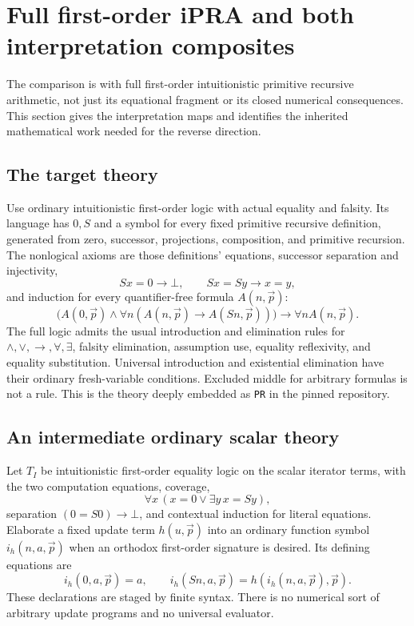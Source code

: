 \section{Full first-order iPRA and both interpretation composites}
\label{sec:interpretations}

The comparison is with full first-order intuitionistic primitive recursive
arithmetic, not just its equational fragment or its closed numerical
consequences.  This section gives the interpretation maps and identifies
the inherited mathematical work needed for the reverse direction.

\subsection{The target theory}

Use ordinary intuitionistic first-order logic with actual equality and
falsity.  Its language has $0,S$ and a symbol for every fixed primitive
recursive definition, generated from zero, successor, projections,
composition, and primitive recursion.  The nonlogical axioms are those
definitions' equations, successor separation and injectivity,
\[
   Sx=0\to\bot,\qquad Sx=Sy\to x=y,
\]
and induction for every quantifier-free formula $A(n,\vec p)$:
\[
 \bigl(A(0,\vec p)\wedge
       \forall n(A(n,\vec p)\to A(Sn,\vec p))\bigr)
       \to\forall n A(n,\vec p).
\]
The full logic admits the usual introduction and elimination rules for
$\wedge,\vee,\to,\forall,\exists$, falsity elimination, assumption use,
equality reflexivity, and equality substitution.  Universal introduction
and existential elimination have their ordinary fresh-variable conditions.
Excluded middle for arbitrary formulas is not a rule.  This is the theory
deeply embedded as \texttt{PR} in the pinned repository.

\subsection{An intermediate ordinary scalar theory}

Let $T_I$ be intuitionistic first-order equality logic on the scalar
iterator terms, with the two computation equations, coverage,
\[
             \forall x\,(x=0\vee\exists y\,x=Sy),
\]
separation $(0=S0)\to\bot$, and contextual induction for literal
equations.  Elaborate a fixed update term $h(u,\vec p)$ into an ordinary
function symbol $i_h(n,a,\vec p)$ when an orthodox first-order signature is
desired.  Its defining equations are
\[
 i_h(0,a,\vec p)=a,\qquad
 i_h(Sn,a,\vec p)=h(i_h(n,a,\vec p),\vec p).
\]
These declarations are staged by finite syntax.  There is no numerical
sort of arbitrary update programs and no universal evaluator.

